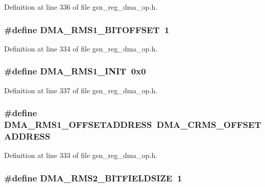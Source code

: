 Definition at line 336 of file gsn\_\-reg\_\-dma\_\-op.h.

\hypertarget{a00547_a0e0ffe41bd1e2055978844ea0d5ca479}{
\subsubsection[{DMA\_\-RMS1\_\-BITOFFSET}]{\setlength{\rightskip}{0pt plus 5cm}\#define DMA\_\-RMS1\_\-BITOFFSET~1}}
\label{a00547_a0e0ffe41bd1e2055978844ea0d5ca479}


Definition at line 334 of file gsn\_\-reg\_\-dma\_\-op.h.

\hypertarget{a00547_acaee22bc62c9866ff41a7b47bcb54355}{
\subsubsection[{DMA\_\-RMS1\_\-INIT}]{\setlength{\rightskip}{0pt plus 5cm}\#define DMA\_\-RMS1\_\-INIT~0x0}}
\label{a00547_acaee22bc62c9866ff41a7b47bcb54355}


Definition at line 337 of file gsn\_\-reg\_\-dma\_\-op.h.

\hypertarget{a00547_adb3fdf021da84959e8e6b79e5005f1fa}{
\subsubsection[{DMA\_\-RMS1\_\-OFFSETADDRESS}]{\setlength{\rightskip}{0pt plus 5cm}\#define DMA\_\-RMS1\_\-OFFSETADDRESS~DMA\_\-CRMS\_\-OFFSETADDRESS}}
\label{a00547_adb3fdf021da84959e8e6b79e5005f1fa}


Definition at line 333 of file gsn\_\-reg\_\-dma\_\-op.h.

\hypertarget{a00547_a9476c50057bc6010fd8ddc59dcca2b66}{
\subsubsection[{DMA\_\-RMS2\_\-BITFIELDSIZE}]{\setlength{\rightskip}{0pt plus 5cm}\#define DMA\_\-RMS2\_\-BITFIELDSIZE~1}}
\label{a00547_a9476c50057bc6010fd8ddc59dcca2b66}


